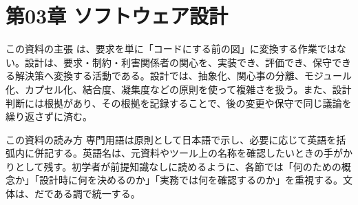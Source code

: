 \section{第03章 ソフトウェア設計}
\begin{pointbox}{この資料の主張}
  は、要求を単に「コードにする前の図」に変換する作業ではない。設計は、要求・制約・利害関係者の関心を、実装でき、評価でき、保守できる解決策へ変換する活動である。設計では、抽象化、関心事の分離、モジュール化、カプセル化、結合度、凝集度などの原則を使って複雑さを扱う。また、設計判断には根拠があり、その根拠を記録することで、後の変更や保守で同じ議論を繰り返さずに済む。
  \end{pointbox}

\begin{pointbox}{この資料の読み方}
  専門用語は原則として日本語で示し、必要に応じて英語を括弧内に併記する。英語名は、元資料やツール上の名称を確認したいときの手がかりとして残す。初学者が前提知識なしに読めるように、各節では「何のための概念か」「設計時に何を決めるのか」「実務では何を確認するのか」を重視する。文体は、だである調で統一する。
  \end{pointbox}
